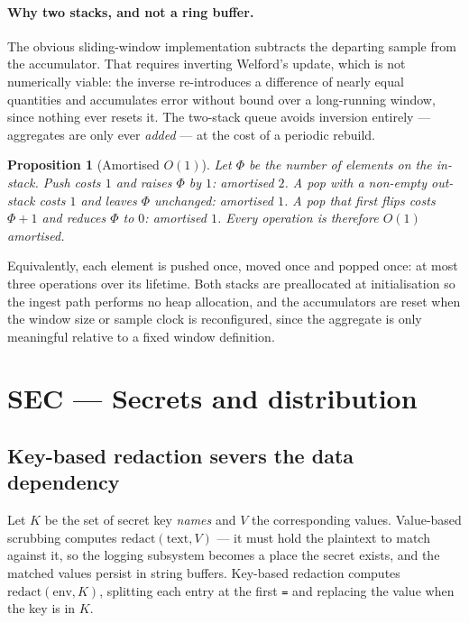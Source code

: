 \documentclass[11pt]{article}
\newtheorem{prop}{Proposition}[section]
\begin{document}
\paragraph{Why two stacks, and not a ring buffer.} The obvious sliding-window
implementation subtracts the departing sample from the accumulator. That
requires inverting Welford's update, which is not numerically viable: the
inverse re-introduces a difference of nearly equal quantities and accumulates
error without bound over a long-running window, since nothing ever resets it.
The two-stack queue avoids inversion entirely --- aggregates are only ever
\emph{added} --- at the cost of a periodic rebuild.

\begin{prop}[Amortised $O(1)$]
Let $\Phi$ be the number of elements on the in-stack. Push costs $1$ and raises
$\Phi$ by $1$: amortised $2$. A pop with a non-empty out-stack costs $1$ and
leaves $\Phi$ unchanged: amortised $1$. A pop that first flips costs
$\Phi + 1$ and reduces $\Phi$ to $0$: amortised $1$. Every operation is
therefore $O(1)$ amortised.
\end{prop}

Equivalently, each element is pushed once, moved once and popped once: at most
three operations over its lifetime. Both stacks are preallocated at
initialisation so the ingest path performs no heap allocation, and the
accumulators are reset when the window size or sample clock is reconfigured,
since the aggregate is only meaningful relative to a fixed window definition.

\section{SEC --- Secrets and distribution}

\subsection{Key-based redaction severs the data dependency}
\label{lbl:HS-SEC-01}

Let $K$ be the set of secret key \emph{names} and $V$ the corresponding values.
Value-based scrubbing computes $\mathrm{redact}(\mathrm{text}, V)$ --- it must
hold the plaintext to match against it, so the logging subsystem becomes a
place the secret exists, and the matched values persist in string buffers.
Key-based redaction computes $\mathrm{redact}(\mathrm{env}, K)$, splitting each
entry at the first \texttt{=} and replacing the value when the key is in $K$.
\end{document}
